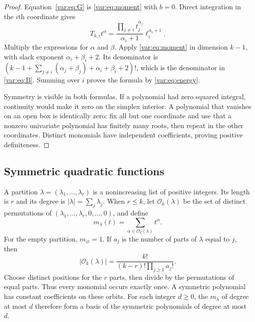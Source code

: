 \documentclass[11pt]{article}
\begin{document}
\begin{proof}
Equation~\eqref{var:eq:G} is \eqref{var:eq:moment} with $b=0$.
Direct integration in the $i$th coordinate gives
\begin{equation}\label{var:eq:monomial-action}
 T_{k,i}t^\alpha
 =\frac{\prod_{j\ne i}t_j^{\alpha_j}}{\alpha_i+1}
                     \ell_i^{\alpha_i+1}.
\end{equation}
Multiply the expressions for $\alpha$ and $\beta$.
Apply \eqref{var:eq:moment} in dimension $k-1$, with slack exponent
$\alpha_i+\beta_i+2$.
Its denominator is
$(k-1+\sum_{j\ne i}(\alpha_j+\beta_j)+\alpha_i+\beta_i+2)!$,
which is the denominator in \eqref{var:eq:B}.
Summing over $i$ proves the formula by \eqref{var:eq:energy}.

Symmetry is visible in both formulas.
If a polynomial had zero squared integral, continuity would make it
zero on the simplex interior.
A polynomial that vanishes on an open box is identically zero:
fix all but one coordinate and use that a nonzero univariate polynomial
has finitely many roots, then repeat in the other coordinates.
Distinct monomials have independent coefficients, proving positive
definiteness.
\end{proof}

\subsection{Symmetric quadratic functions}

A partition $\lambda=(\lambda_1,\ldots,\lambda_r)$ is a nonincreasing
list of positive integers.  Its length is $r$ and its degree is
$|\lambda|=\sum_j\lambda_j$.
When $r\leq k$, let $\mathcal O_k(\lambda)$ be the set of distinct
permutations of $(\lambda_1,\ldots,\lambda_r,0,\ldots,0)$, and define
\[
 m_\lambda(t)=\sum_{\alpha\in\mathcal O_k(\lambda)}t^\alpha.
\]
For the empty partition, $m_{\varnothing}=1$.
If $a_j$ is the number of parts of $\lambda$ equal to $j$, then
\begin{equation}\label{var:eq:orbit-size}
 |\mathcal O_k(\lambda)|=\frac{k!}{(k-r)!\prod_{j\geq1}a_j!}.
\end{equation}
Choose distinct positions for the $r$ parts, then divide by the
permutations of equal parts.  Thus every monomial occurs exactly once.
A symmetric polynomial has constant coefficients on these orbits.
For each integer $d\geq0$, the $m_\lambda$ of degree at most $d$
therefore form a basis of the
symmetric polynomials of degree at most $d$.
\end{document}
